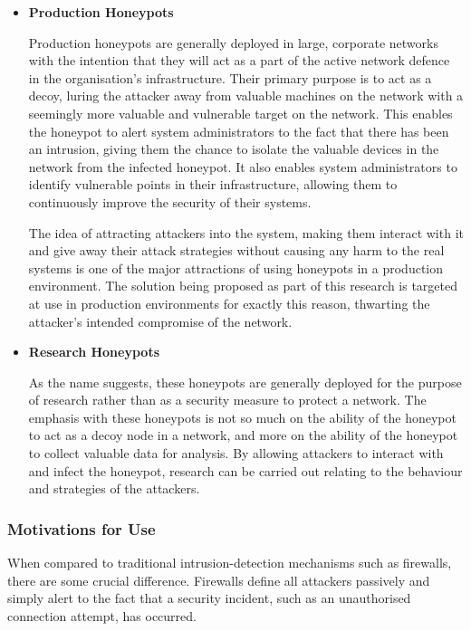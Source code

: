 \begin{itemize}
	\item \textbf{Production Honeypots}
	
	Production honeypots are generally deployed in large, corporate networks with the intention that they will act as a part of the active network defence in the organisation’s infrastructure. Their primary purpose is to act as a decoy, luring the attacker away from valuable machines on the network with a seemingly more valuable and vulnerable target on the network. This enables the honeypot to alert system administrators to the fact that there has been an intrusion, giving them the chance to isolate the valuable devices in the network from the infected honeypot. It also enables system administrators to identify vulnerable points in their infrastructure, allowing them to continuously improve the security of their systems. 
	
	The idea of attracting attackers into the system, making them interact with it and give away their attack strategies without causing any harm to the real systems is one of the major attractions of using honeypots in a production environment. The solution being proposed as part of this research is targeted at use in production environments for exactly this reason, thwarting the attacker’s intended compromise of the network.
	
	
	\item \textbf{Research Honeypots}
	
	As the name suggests, these honeypots are generally deployed for the purpose of research rather than as a security measure to protect a network. The emphasis with these honeypots is not so much on the ability of the honeypot to act as a decoy node in a network, and more on the ability of the honeypot to collect valuable data for analysis. By allowing attackers to interact with and infect the honeypot, research can be carried out relating to the behaviour and strategies of the attackers.
	
\end{itemize}


\subsubsection{Motivations for Use}

When compared to traditional intrusion-detection mechanisms such as firewalls, there are some crucial difference. Firewalls define all attackers passively and simply alert to the fact that a security incident, such as an unauthorised connection attempt, has occurred. 

